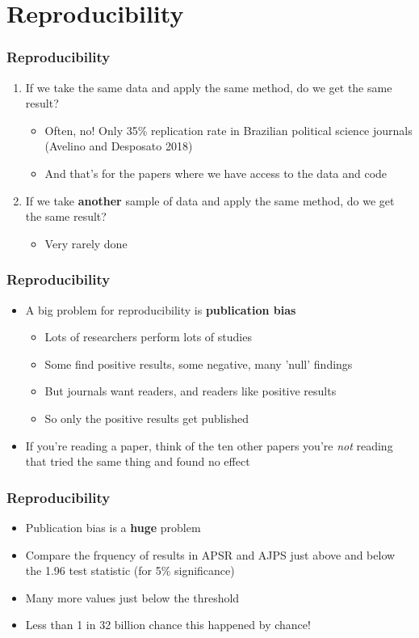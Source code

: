 \documentclass[xcolor=x11names,compress]{beamer}\usepackage[]{graphicx}\usepackage[]{xcolor}
\renewcommand{\(}{\begin{columns}}
\renewcommand{\)}{\end{columns}}
\newcommand{\<}[1]{\begin{column}{#1}}
\renewcommand{\>}{\end{column}}
\begin{document}
\section{Reproducibility}


\begin{frame}
\frametitle{Reproducibility}
\begin{enumerate}
\item If we take the same data and apply the same method, do we get the same result?
\pause
\begin{itemize}
\item Often, no! Only 35\% replication rate in Brazilian political science journals (Avelino and Desposato 2018)
\pause
\item And that's for the papers where we have access to the data and code
\pause
\end{itemize}
\item If we take \textbf{another} sample of data and apply the same method, do we get the same result?
\begin{itemize}
\item Very rarely done
\end{itemize}
\end{enumerate}
\end{frame}


\begin{frame}
\frametitle{Reproducibility}
\begin{itemize}
\item A big problem for reproducibility is \textbf{publication bias}
\pause
\begin{itemize}
\item Lots of researchers perform lots of studies
\pause
\item Some find positive results, some negative, many 'null' findings
\pause
\item But journals want readers, and readers like positive results
\pause
\item So only the positive results get published
\pause
\end{itemize}
\item If you're reading a paper, think of the ten other papers you're \textit{not} reading that tried the same thing and found no effect
\end{itemize}
\end{frame}

\begin{frame}
\frametitle{Reproducibility}
\begin{itemize}
\item Publication bias is a \textbf{huge} problem
\pause
\item Compare the frquency of results in APSR and AJPS just above and below the 1.96 test statistic (for 5\% significance)
\pause
\item Many more values just below the threshold
\pause
\item Less than 1 in 32 billion chance this happened by chance!
\end{itemize}
\end{frame}
\end{document}

